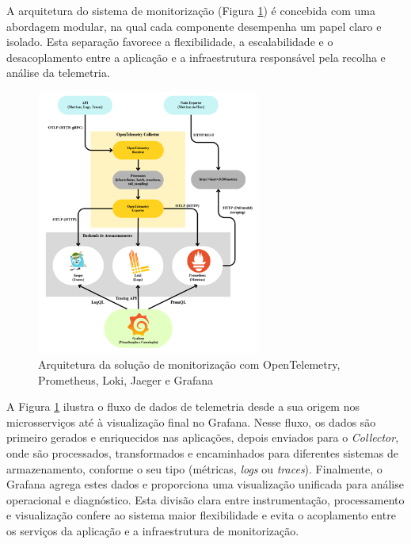 A arquitetura do sistema de monitorização (Figura \ref{fig:otel_arch}) é concebida com uma abordagem modular, na qual cada componente desempenha um papel claro e isolado. Esta separação favorece a flexibilidade, a escalabilidade e o desacoplamento entre a aplicação e a infraestrutura responsável pela recolha e análise da telemetria.


\begin{figure}[H]
    \centering
    \includegraphics[width=0.65\textwidth]{images/Diagramas/arquitetura_da_solucao.png}
    \caption{Arquitetura da solução de monitorização com OpenTelemetry, Prometheus, Loki, Jaeger e Grafana}
    \label{fig:otel_arch}
\end{figure}

A Figura \ref{fig:otel_arch} ilustra o fluxo de dados de telemetria desde a sua origem nos microsserviços até à visualização final no Grafana. Nesse fluxo, os dados são primeiro gerados e enriquecidos nas aplicações, depois enviados para o \textit{Collector}, onde são processados, transformados e encaminhados para diferentes sistemas de armazenamento, conforme o seu tipo (métricas, \textit{logs} ou \textit{traces}). Finalmente, o Grafana agrega estes dados e proporciona uma visualização unificada para análise operacional e diagnóstico. Esta divisão clara entre instrumentação, processamento e visualização confere ao sistema maior flexibilidade e evita o acoplamento entre os serviços da aplicação e a infraestrutura de monitorização.

